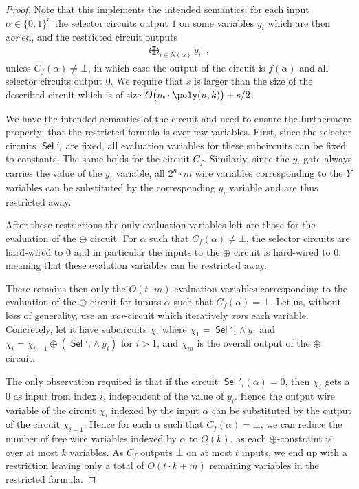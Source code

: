 \documentclass[10pt,a4paper]{article}
\theoremstyle{plain}
\theoremstyle{remark}
\theoremstyle{definition}
\newcommand{\eqcomma}{\enspace ,}
\newcommand{\set}[1]{\{#1\}}
\DeclareMathOperator{\sel}{\mathsf{Sel}}
\begin{document}
\begin{proof}
  Note that this implements the intended semantics: for each
  input $\alpha \in \set{0,1}^n$ the selector circuits output $1$ on
  some variables $y_i$ which are then \emph{xor}'ed, and the
  restricted circuit outputs
  \begin{align}
    \bigoplus_{i \in N(\alpha)} y_i \eqcomma
  \end{align}
  unless $C_f(\alpha) \neq \bot$, in which case the output of the
  circuit is $f(\alpha)$ and all selector circuits output $0$. We
  require that $s$ is larger than the size of the described circuit
  which is of size $O\big(m \cdot \poly(n, k)\big) + s/2$.

  We have the intended semantics of the circuit and need to ensure the
  furthermore property: that the restricted formula is over few
  variables. First, since the selector circuits $\sel'_i$ are fixed,
  all evaluation variables for these subcircuits can be fixed to
  constants. The same holds for the circuit $C_f$. Similarly, since
  the $y_i$ gate always carries the value of the $y_i$ variable, all
  $2^n \cdot m$ wire variables corresponding to the $Y$ variables can
  be substituted by the corresponding $y_i$ variable and are thus
  restricted away.

  After these restrictions the only evaluation variables left are
  those for the evaluation of the $\oplus$ circuit.  For $\alpha$ such
  that $C_f(\alpha) \neq \bot$, the selector circuits are hard-wired
  to $0$ and in particular the inputs to the $\oplus$ circuit is
  hard-wired to $0$, meaning that these evalation variables can be
  restricted away.

  There remains then only the $O(t \cdot m)$ evaluation variables
  corresponding to the evaluation of the $\oplus$ circuit for inputs
  $\alpha$ such that $C_f(\alpha) = \bot$. Let us, without loss of
  generality, use an \emph{xor}-circuit which iteratively \emph{xor}s
  each variable.  Concretely, let it have subcircuits $\chi_i$ where
  $\chi_1 = \sel'_1 \wedge y_1$ and
  $\chi_{i} = \chi_{i-1} \oplus (\sel'_i \wedge y_i)$ for $i > 1$, and
  $\chi_m$ is the overall output of the $\oplus$ circuit.

  The only observation required is that if the circuit
  $\sel'_i(\alpha) = 0$, then $\chi_i$ gets a $0$ as input from index
  $i$, independent of the value of $y_i$. Hence the output wire
  variable of the circuit $\chi_i$ indexed by the input $\alpha$ can
  be substituted by the output of the circuit $\chi_{i-1}$. Hence for
  each $\alpha$ such that $C_f(\alpha) = \bot$, we can reduce the
  number of free wire variables indexed by $\alpha$ to $O(k)$, as each
  $\oplus$-constraint is over at most $k$ variables.  As $C_f$ outputs
  $\bot$ on at most $t$ inputs, we end up with a restriction leaving
  only a total of $O(t \cdot k + m)$ remaining variables in the
  restricted formula.


\end{proof}
\end{document}
